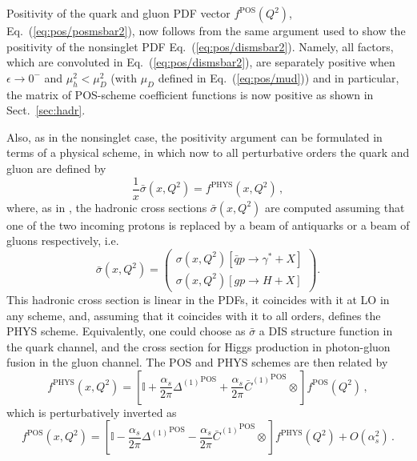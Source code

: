 Positivity of the quark and gluon PDF vector $ f^{{\textrm{POS}}}(Q^2)$,
Eq.~(\ref{eq:pos/posmsbar2}), now follows from the same argument used to
show the positivity of the nonsinglet PDF 
Eq.~(\ref{eq:pos/dismsbar2}). Namely, all
factors, which are convoluted in Eq.~(\ref{eq:pos/dismsbar2}), are 
separately positive when $\epsilon \to 0^-$ and  $\mu_h^2 < \mu_D^2$ (with
$\mu_D$ defined in Eq.~(\ref{eq:pos/mud})) and in particular, the matrix of POS-scheme coefficient
functions is now positive as shown in Sect.~\ref{sec:hadr}.

Also, as in the nonsinglet case,  the positivity argument can be formulated in terms of
a physical scheme, in which now 
to all perturbative orders the quark and gluon are defined by
\begin{equation}\label{eq:pos/phys}
 \frac{1}{x} \bar\sigma(x,Q^2)=f^{\textrm{PHYS}}(x,Q^2) \,,
\end{equation}
where, as in \cite{Altarelli:1998gn}, the hadronic cross sections $\bar\sigma(x,Q^2)$ are computed
assuming that one of the two incoming protons is replaced 
by a beam of antiquarks or a beam of gluons respectively, i.e.\ 
\begin{equation}\label{eq:pos/physxsec}
   \bar\sigma(x,Q^2)=\left(\begin{array}{c} \sigma(x,Q^2)[\bar q
       p\to \gamma^*+X]\\ \sigma(x,Q^2)[gp \to H+X]\end{array}\right).
\end{equation}
This hadronic cross section is linear in the PDFs, it coincides with it
at LO in any scheme, and, assuming that it coincides with it to all
orders, defines the PHYS scheme. Equivalently, one could choose as
$\bar \sigma$ a DIS structure function in the quark channel, and the
cross section for Higgs production in photon-gluon fusion in the gluon
channel.
The POS and PHYS schemes are then related by
\begin{equation}\label{eq:pos/postodis}
f^{\textrm{PHYS}}(x,Q^2)=
\left[\mathbb{I}+\frac{\alpha_s}{2\pi} {\Delta^{(1)}}^{\textrm{POS}}
  +\frac{\alpha_s}{2\pi}  {\bar
    C^{(1)}{}}^{\textrm{POS}}\otimes\right]f^{\textrm{POS}}(Q^2) \,,
\end{equation}
which is perturbatively inverted as  
\begin{equation}\label{eq:pos/distopos}
f^{\textrm{POS}}(x,Q^2)=
\left[\mathbb{I}-\frac{\alpha_s}{2\pi} {\Delta^{(1)}}^{\textrm{POS}}
  -\frac{\alpha_s}{2\pi}  {\bar
    C^{(1)}{}}^{\textrm{POS}}\otimes\right]f^{\textrm{PHYS}}(Q^2)+O(\alpha_s^2)\,.
\end{equation}

